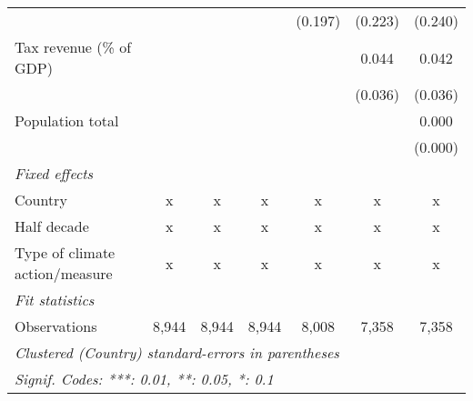 \begin{tabular}{lcccccc}
                                                                  &         &         &               & (0.197)       & (0.223)      & (0.240)\\   
   Tax revenue (\% of GDP)                                        &         &         &               &               & 0.044        & 0.042\\   
                                                                  &         &         &               &               & (0.036)      & (0.036)\\   
   Population total                                               &         &         &               &               &              & 0.000\\   
                                                                  &         &         &               &               &              & (0.000)\\   
   \emph{Fixed effects}\\
   Country                                                        & x       & x       & x             & x             & x            & x\\  
   Half decade                                                    & x       & x       & x             & x             & x            & x\\  
   Type of climate action/measure                                 & x       & x       & x             & x             & x            & x\\  
   \midrule \emph{Fit statistics}\\
   Observations                                                   & 8,944   & 8,944   & 8,944         & 8,008         & 7,358        & 7,358\\  
   \midrule
   \multicolumn{7}{l}{\emph{Clustered (Country) standard-errors in parentheses}}\\
   \multicolumn{7}{l}{\emph{Signif. Codes: ***: 0.01, **: 0.05, *: 0.1}}\\
\end{tabular}
\par\endgroup



